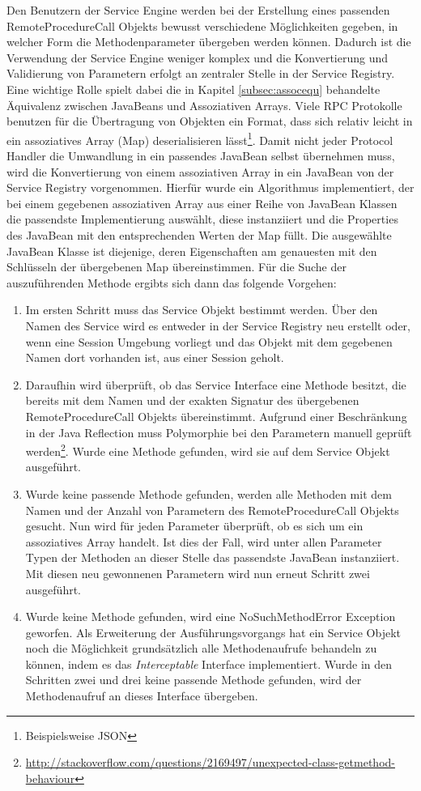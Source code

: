 Den Benutzern der Service Engine werden bei der Erstellung eines passenden
RemoteProcedureCall Objekts bewusst verschiedene Möglichkeiten gegeben, in
welcher Form die Methodenparameter übergeben werden können. Dadurch ist die
Verwendung der Service Engine weniger komplex und die Konvertierung und
Validierung von Parametern erfolgt an zentraler Stelle in der Service Registry.
Eine wichtige Rolle spielt dabei die in Kapitel \ref{subsec:assocequ} behandelte
Äquivalenz zwischen JavaBeans und Assoziativen Arrays. Viele \ac{RPC} Protokolle
benutzen für die Übertragung von Objekten ein Format, dass sich relativ leicht in
ein assoziatives Array (Map) deserialisieren lässt\footnote{Beispielsweise
\ac{JSON}}. Damit nicht jeder Protocol Handler die Umwandlung in ein passendes
JavaBean selbst übernehmen muss, wird die Konvertierung von einem assoziativen
Array in ein JavaBean von der Service Registry vorgenommen. Hierfür wurde
ein Algorithmus implementiert, der bei einem gegebenen assoziativen Array aus
einer Reihe von JavaBean Klassen die passendste Implementierung auswählt, diese
instanziiert und die Properties des JavaBean mit den entsprechenden Werten der
Map füllt. Die ausgewählte JavaBean Klasse ist diejenige, deren Eigenschaften
am genauesten mit den Schlüsseln der übergebenen Map übereinstimmen. Für die
Suche der auszuführenden Methode ergibts sich dann das folgende Vorgehen:

\begin{enumerate}
  \item Im ersten Schritt muss das Service Objekt bestimmt werden. Über den
  Namen des Service wird es entweder in der Service Registry neu erstellt oder,
  wenn eine Session Umgebung vorliegt und das Objekt mit dem gegebenen Namen
  dort vorhanden ist, aus einer Session geholt.
  \item Daraufhin wird überprüft, ob das Service Interface eine Methode
  besitzt, die bereits mit dem Namen und der exakten Signatur des übergebenen
  RemoteProcedureCall Objekts übereinstimmt. Aufgrund einer Beschränkung in der
  Java Reflection muss Polymorphie bei den Parametern manuell geprüft
  werden\footnote{\url{http://stackoverflow.com/questions/2169497/unexpected-class-getmethod-behaviour}}.
  Wurde eine Methode gefunden, wird sie auf dem Service Objekt ausgeführt. 
  \item Wurde keine passende Methode gefunden, werden alle Methoden mit dem
  Namen und der Anzahl von Parametern des RemoteProcedureCall Objekts gesucht.
  Nun wird für jeden Parameter überprüft, ob es sich um ein assoziatives Array
  handelt. Ist dies der Fall, wird unter allen Parameter Typen der Methoden an
  dieser Stelle das passendste JavaBean instanziiert. Mit diesen neu gewonnenen
  Parametern wird nun erneut Schritt zwei ausgeführt.
  \item Wurde keine Methode gefunden, wird eine NoSuchMethodError Exception
  geworfen. Als Erweiterung der Ausführungsvorgangs hat ein Service Objekt noch die
  Möglichkeit grundsätzlich alle Methodenaufrufe behandeln zu können, indem es
  das \emph{Interceptable} Interface implementiert. Wurde in den Schritten zwei
  und drei keine passende Methode gefunden, wird der Methodenaufruf an dieses
  Interface übergeben.
\end{enumerate}

